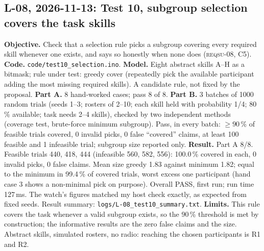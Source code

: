 \IfFileExists{IEEEtran.cls}{\documentclass[conference]{IEEEtran}}{\documentclass[10pt,twocolumn]{article}}
\newcommand{\req}[1]{\textsc{reqsu-}#1}
\begin{document}
\subsection*{L-08, 2026-11-13: Test 10, subgroup selection covers the task skills}
\textbf{Objective.} Check that a selection rule picks a subgroup covering every required skill whenever one exists, and says so honestly when none does (\req{08}, C5). \textbf{Code.} \texttt{code/test10\_selection.ino}. \textbf{Model.} Eight abstract skills A--H as a bitmask; rule under test: greedy cover (repeatedly pick the available participant adding the most missing required skills). A candidate rule, not fixed by the proposal. \textbf{Part A.} 8 hand-worked cases; pass 8 of 8. \textbf{Part B.} 3 batches of 1000 random trials (seeds 1--3; rosters of 2--10; each skill held with probability 1/4; 80\,\% available; task needs 2--4 skills), checked by two independent methods (coverage test, brute-force minimum subgroup). Pass, in every batch: $\ge 90\,\%$ of feasible trials covered, 0 invalid picks, 0 false ``covered'' claims, at least 100 feasible and 1 infeasible trial; subgroup size reported only. \textbf{Result.} Part A 8/8. Feasible trials 440, 418, 444 (infeasible 560, 582, 556): 100.0\,\% covered in each, 0 invalid picks, 0 false claims. Mean size greedy 1.83 against minimum 1.82; equal to the minimum in 99.4\,\% of covered trials, worst excess one participant (hand case 3 shows a non-minimal pick on purpose). Overall PASS, first run; run time 127\,ms. The watch's figures matched my host check exactly, as expected from fixed seeds. Result summary: \texttt{logs/L-08\_test10\_summary.txt}. \textbf{Limits.} This rule covers the task whenever a valid subgroup exists, so the 90\,\% threshold is met by construction; the informative results are the zero false claims and the size. Abstract skills, simulated rosters, no radio: reaching the chosen participants is R1 and R2.
\end{document}
